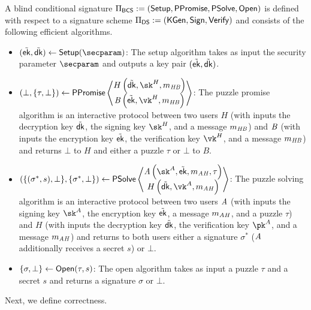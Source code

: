 \begin{definition}
A blind conditional signature $\Pi_\mathsf{BCS} :=({\mathsf{Setup}}, \mathsf{PPromise}, \mathsf{PSolve}, \mathsf{Open})$ is defined with respect to a signature scheme $\Pi_{\mathsf{DS}} := ({\mathsf{KGen}}, {\mathsf{Sign}}, {\mathsf{Verify}})$ and consists of the following efficient algorithms.

\begin{itemize}
    \item {$(\tilde{\ek}, \tilde{\dk})\gets \Setup(\secparam)$}: The setup algorithm takes as input the security parameter $\secparam$ and outputs a key pair $(\tilde{\mathsf{ek}}, \tilde{\mathsf{dk}})$.
    \item {$(\bot, \{\tau, \bot\}) \gets \Promise \left\langle \begin{matrix} H \left(\tilde{\dk}, \sk^H, m_\hb \right)\\ \bob \left(\tilde{\ek}, \vk^H, m_\hb \right) \end{matrix} \right\rangle $}: The puzzle promise algorithm is an interactive protocol between two users $H$ (with inputs the decryption key $\tilde {\mathsf{dk}}$, the signing key $\sk^H$, and a message $m_{\mathit{HB}}$) and $\mathit{B}$ (with inputs the encryption key $\tilde {\mathsf{ek}}$, the verification key $\vk^H$, and a message $m_{\mathit{HB}}$)  and returns $\bot$ to $H$ and either a puzzle $\tau$ or $\bot$ to $B$.
    \item {$(\{(\sigma^*, s), \bot\}, \{\sigma^*, \bot\}) \gets \Pay \left\langle \begin{matrix} \alice \left(\sk^A, \tilde{\ek}, m_\ah, \tau\right)\\ H \left(\tilde{\dk}, \vk^A, m_\ah\right) \end{matrix} \right\rangle $}: The puzzle solving algorithm is an interactive protocol between two users $\mathit{A}$ (with inputs the signing key $\sk^A$, the encryption key $\tilde {\mathsf{ek}}$, a message $m_{\mathit{AH}}$, and a puzzle $\tau$) and $H$ (with inputs the decryption key $\tilde {\mathsf{dk}}$, the verification key $\pk^A$, and a message $m_{\mathit{AH}}$) and returns to both users either a signature $\sigma^*$ ($\mathit{A}$ additionally receives a secret $s$) or $\bot$.
    \item {$\{\sigma, \bot\}\gets \mathsf{Open}(\tau, s)$}: The open algorithm takes as input a puzzle $\tau$ and a secret $s$ and returns a signature $\sigma$ or $\bot$.
\end{itemize}
\end{definition}

Next, we define correctness.

